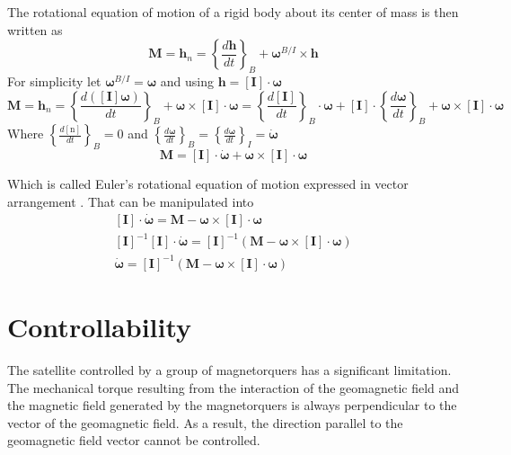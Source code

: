 The rotational equation of motion of a rigid body about its center of mass is then written as
\begin{equation}
\boldsymbol{M}=\boldsymbol{h}_{n}=\left\{\frac{d \boldsymbol{h}}{d t}\right\}_{B}+\boldsymbol{\omega}^{B / I} \times \boldsymbol{h}
\end{equation}
For simplicity let $\boldsymbol{\omega}^{B / I}=\boldsymbol{\omega}$ and using $\boldsymbol{h}=[\mathbf{I}] \cdot \boldsymbol{\omega}$
\begin{equation}
\boldsymbol{M}=\boldsymbol{h}_{n}=\left\{\frac{d([\mathbf{I}] \boldsymbol{\omega})}{d t}\right\}_{B}+\boldsymbol{\omega} \times[\mathbf{I}] \cdot \boldsymbol{\omega}=\left\{\frac{d[\mathbf{I}]}{d t}\right\}_{B} \cdot \boldsymbol{\omega}+[\mathbf{I}] \cdot\left\{\frac{d \boldsymbol{\omega}}{d t}\right\}_{B}+\boldsymbol{\omega} \times[\mathbf{I}] \cdot \boldsymbol{\omega}
\end{equation}
Where $\left\{\frac{d[\mathrm{n}]}{d t}\right\}_{B}=0$ and $\left\{\frac{d \boldsymbol{\omega}}{d t}\right\}_{B}=\left\{\frac{d \boldsymbol{\omega}}{d t}\right\}_{I}=\dot{\boldsymbol{\omega}}$
\begin{equation}
\boldsymbol{M}=[\mathbf{I}] \cdot \dot{\boldsymbol{\omega}}+\boldsymbol{\omega} \times[\mathbf{I}] \cdot \boldsymbol{\omega}
\end{equation}

Which is called Euler's rotational equation of motion expressed in vector arrangement \cite{wie1998space}.
That can be manipulated into
\begin{align}
{[\mathbf{I}] \cdot \dot{\boldsymbol{\omega}}=\boldsymbol{M}-\boldsymbol{\omega} \times[\mathbf{I}] \cdot \boldsymbol{\omega}} \\
{[\mathbf{I}]^{-1}[\mathbf{I}] \cdot \dot{\boldsymbol{\omega}}=[\mathbf{I}]^{-1}(\boldsymbol{M}-\boldsymbol{\omega} \times[\mathbf{I}] \cdot \boldsymbol{\omega})} \\
\dot{\boldsymbol{\omega}}=[\mathbf{I}]^{-1}(\boldsymbol{M}-\boldsymbol{\omega} \times[\mathbf{I}] \cdot \boldsymbol{\omega})
\end{align}


\section{Controllability}
The satellite controlled by a group of magnetorquers has a significant limitation. The mechanical torque resulting from the interaction of the geomagnetic field and the magnetic field generated by the magnetorquers is always perpendicular to the vector of the geomagnetic field. As a result, the direction parallel to the geomagnetic field vector cannot be controlled.

